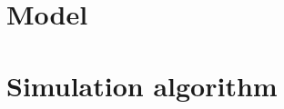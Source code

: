 \documentclass[aps,
superscriptaddress,groupedaddress]{revtex4}
\begin{document}
\section{Model}

\section{Simulation algorithm}
\end{document}
